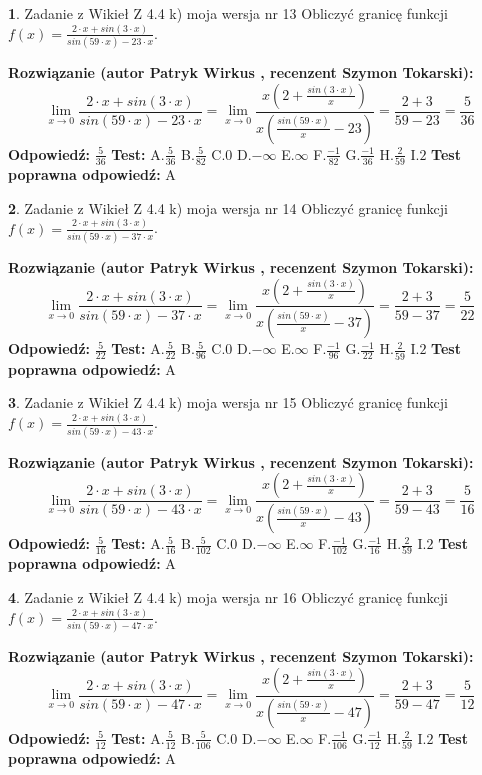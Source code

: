 \documentclass[12pt, a4paper]{article}
\theoremstyle{definition} %
\newtheorem{zad}{}
\newcommand{\zadStart}[1]{\begin{zad}#1\newline}
\newcommand{\zadStop}{\end{zad}}
\newcommand{\rozwStart}[2]{\noindent \textbf{Rozwiązanie (autor #1 , recenzent #2): }\newline}
\newcommand{\rozwStop}{\newline}
\newcommand{\odpStart}{\noindent \textbf{Odpowiedź:}\newline}
\newcommand{\odpStop}{\newline}
\newcommand{\testStart}{\noindent \textbf{Test:}\newline}
\newcommand{\testStop}{\newline}
\newcommand{\kluczStart}{\noindent \textbf{Test poprawna odpowiedź:}\newline}
\newcommand{\kluczStop}{\newline}
\begin{document}
\zadStart{Zadanie z Wikieł Z 4.4 k) moja wersja nr 13}
Obliczyć granicę funkcji $f(x)=\frac{2\cdot x +sin(3\cdot x)}{sin(59\cdot x) -23\cdot x}$.
\zadStop
\rozwStart{Patryk Wirkus}{Szymon Tokarski}
$$\lim\limits_{x\to 0}\frac{2\cdot x +sin(3\cdot x)}{sin(59\cdot x) -23\cdot x}
=\lim\limits_{x\to 0}\frac{x(2+\frac{sin(3\cdot x)}{x})}{x(\frac{sin(59\cdot x)}{x}-23)}
=\frac{2+3}{59-23} = \frac{5}{36}$$
\rozwStop
\odpStart
$\frac{5}{36}$
\odpStop
\testStart
A.$\frac{5}{36}$
B.$\frac{5}{82}$
C.$0$
D.$-\infty$
E.$\infty$
F.$\frac{-1}{82}$
G.$\frac{-1}{36}$
H.$\frac{2}{59}$
I.$2$
\testStop
\kluczStart
A
\kluczStop



\zadStart{Zadanie z Wikieł Z 4.4 k) moja wersja nr 14}
Obliczyć granicę funkcji $f(x)=\frac{2\cdot x +sin(3\cdot x)}{sin(59\cdot x) -37\cdot x}$.
\zadStop
\rozwStart{Patryk Wirkus}{Szymon Tokarski}
$$\lim\limits_{x\to 0}\frac{2\cdot x +sin(3\cdot x)}{sin(59\cdot x) -37\cdot x}
=\lim\limits_{x\to 0}\frac{x(2+\frac{sin(3\cdot x)}{x})}{x(\frac{sin(59\cdot x)}{x}-37)}
=\frac{2+3}{59-37} = \frac{5}{22}$$
\rozwStop
\odpStart
$\frac{5}{22}$
\odpStop
\testStart
A.$\frac{5}{22}$
B.$\frac{5}{96}$
C.$0$
D.$-\infty$
E.$\infty$
F.$\frac{-1}{96}$
G.$\frac{-1}{22}$
H.$\frac{2}{59}$
I.$2$
\testStop
\kluczStart
A
\kluczStop



\zadStart{Zadanie z Wikieł Z 4.4 k) moja wersja nr 15}
Obliczyć granicę funkcji $f(x)=\frac{2\cdot x +sin(3\cdot x)}{sin(59\cdot x) -43\cdot x}$.
\zadStop
\rozwStart{Patryk Wirkus}{Szymon Tokarski}
$$\lim\limits_{x\to 0}\frac{2\cdot x +sin(3\cdot x)}{sin(59\cdot x) -43\cdot x}
=\lim\limits_{x\to 0}\frac{x(2+\frac{sin(3\cdot x)}{x})}{x(\frac{sin(59\cdot x)}{x}-43)}
=\frac{2+3}{59-43} = \frac{5}{16}$$
\rozwStop
\odpStart
$\frac{5}{16}$
\odpStop
\testStart
A.$\frac{5}{16}$
B.$\frac{5}{102}$
C.$0$
D.$-\infty$
E.$\infty$
F.$\frac{-1}{102}$
G.$\frac{-1}{16}$
H.$\frac{2}{59}$
I.$2$
\testStop
\kluczStart
A
\kluczStop



\zadStart{Zadanie z Wikieł Z 4.4 k) moja wersja nr 16}
Obliczyć granicę funkcji $f(x)=\frac{2\cdot x +sin(3\cdot x)}{sin(59\cdot x) -47\cdot x}$.
\zadStop
\rozwStart{Patryk Wirkus}{Szymon Tokarski}
$$\lim\limits_{x\to 0}\frac{2\cdot x +sin(3\cdot x)}{sin(59\cdot x) -47\cdot x}
=\lim\limits_{x\to 0}\frac{x(2+\frac{sin(3\cdot x)}{x})}{x(\frac{sin(59\cdot x)}{x}-47)}
=\frac{2+3}{59-47} = \frac{5}{12}$$
\rozwStop
\odpStart
$\frac{5}{12}$
\odpStop
\testStart
A.$\frac{5}{12}$
B.$\frac{5}{106}$
C.$0$
D.$-\infty$
E.$\infty$
F.$\frac{-1}{106}$
G.$\frac{-1}{12}$
H.$\frac{2}{59}$
I.$2$
\testStop
\kluczStart
A
\kluczStop
\end{document}
